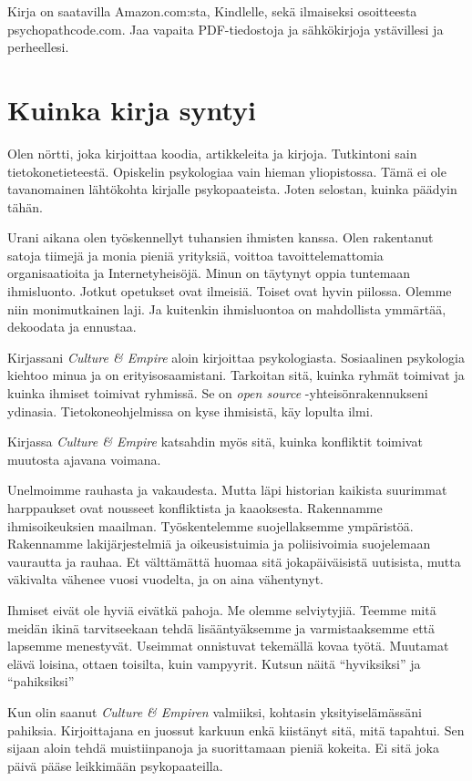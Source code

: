 Kirja on saatavilla Amazon.com:sta, Kindlelle, sekä ilmaiseksi osoitteesta psychopathcode.com. Jaa vapaita PDF-tiedostoja ja sähkökirjoja ystävillesi ja perheellesi.

\section{Kuinka kirja syntyi}

Olen nörtti, joka kirjoittaa koodia, artikkeleita ja kirjoja. Tutkintoni sain tietokonetieteestä. Opiskelin psykologiaa vain hieman yliopistossa. Tämä ei ole tavanomainen lähtökohta kirjalle psykopaateista. Joten selostan, kuinka päädyin tähän.

Urani aikana olen työskennellyt tuhansien ihmisten kanssa. Olen rakentanut satoja tiimejä ja monia pieniä yrityksiä, voittoa tavoittelemattomia organisaatioita ja Internetyheisöjä. Minun on täytynyt oppia tuntemaan ihmisluonto. Jotkut opetukset ovat ilmeisiä. Toiset ovat hyvin piilossa. Olemme niin monimutkainen laji. Ja kuitenkin ihmisluontoa on mahdollista ymmärtää, dekoodata ja ennustaa.

Kirjassani \emph{Culture \& Empire} aloin kirjoittaa psykologiasta. Sosiaalinen psykologia kiehtoo minua ja on erityisosaamistani. Tarkoitan sitä, kuinka ryhmät toimivat ja kuinka ihmiset toimivat ryhmissä. Se on \emph{open source} -yhteisönrakennukseni ydinasia. Tietokoneohjelmissa on kyse ihmisistä, käy lopulta ilmi.

Kirjassa \emph{Culture \& Empire} katsahdin myös sitä, kuinka konfliktit toimivat muutosta ajavana voimana.

Unelmoimme rauhasta ja vakaudesta. Mutta läpi historian kaikista suurimmat harppaukset ovat nousseet konfliktista ja kaaoksesta. Rakennamme ihmisoikeuksien maailman. Työskentelemme suojellaksemme ympäristöä. Rakennamme lakijärjestelmiä ja oikeusistuimia ja poliisivoimia suojelemaan vaurautta ja rauhaa. Et välttämättä huomaa sitä jokapäiväisistä uutisista, mutta väkivalta vähenee vuosi vuodelta, ja on aina vähentynyt.

Ihmiset eivät ole hyviä eivätkä pahoja. Me olemme selviytyjiä. Teemme mitä meidän ikinä tarvitseekaan tehdä lisääntyäksemme ja varmistaaksemme että lapsemme menestyvät. Useimmat onnistuvat tekemällä kovaa työtä. Muutamat elävä loisina, ottaen toisilta, kuin vampyyrit. Kutsun näitä ``hyviksiksi'' ja ``pahiksiksi''

Kun olin saanut \emph{Culture \& Empiren} valmiiksi, kohtasin yksityiselämässäni pahiksia. Kirjoittajana en juossut karkuun enkä kiistänyt sitä, mitä tapahtui. Sen sijaan aloin tehdä muistiinpanoja ja suorittamaan pieniä kokeita. Ei sitä joka päivä pääse leikkimään psykopaateilla.

